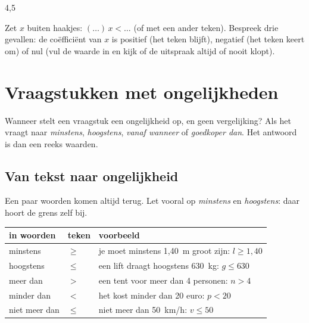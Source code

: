 \begin{alleenvoor}{4,5}
\begin{werkwijze}
Zet $x$ buiten haakjes: $(\ldots)\,x < \ldots$ (of met een ander teken). Bespreek drie gevallen: de coëfficiënt van $x$ is positief (het teken blijft), negatief (het teken keert om) of nul (vul de waarde in en kijk of de uitspraak altijd of nooit klopt).
\end{werkwijze}

\begin{oefeningen}
\end{oefeningen}
\end{alleenvoor}

\section{Vraagstukken met ongelijkheden}

Wanneer stelt een vraagstuk een ongelijkheid op, en geen vergelijking? Als het vraagt naar \textit{minstens}, \textit{hoogstens}, \textit{vanaf wanneer} of \textit{goedkoper dan}. Het antwoord is dan een reeks waarden.

\subsection{Van tekst naar ongelijkheid}

Een paar woorden komen altijd terug. Let vooral op \textit{minstens} en \textit{hoogstens}: daar hoort de grens zelf bij.

\begin{center}\renewcommand{\arraystretch}{1.5}%
\begin{tabular}{|>{\centering\arraybackslash}m{2.6cm}|>{\centering\arraybackslash}m{1.4cm}|>{\centering\arraybackslash}m{7.4cm}|}
\hline
\textbf{in woorden} & \textbf{teken} & \textbf{voorbeeld} \\ \hline
minstens & $\geqslant$ & je moet minstens 1,40~m groot zijn: $l \geqslant 1{,}40$ \\ \hline
hoogstens & $\leqslant$ & een lift draagt hoogstens 630~kg: $g \leqslant 630$ \\ \hline
meer dan & $>$ & een tent voor meer dan 4 personen: $n > 4$ \\ \hline
minder dan & $<$ & het kost minder dan 20 euro: $p < 20$ \\ \hline
niet meer dan & $\leqslant$ & niet meer dan 50~km/h: $v \leqslant 50$ \\ \hline
\end{tabular}\end{center}

